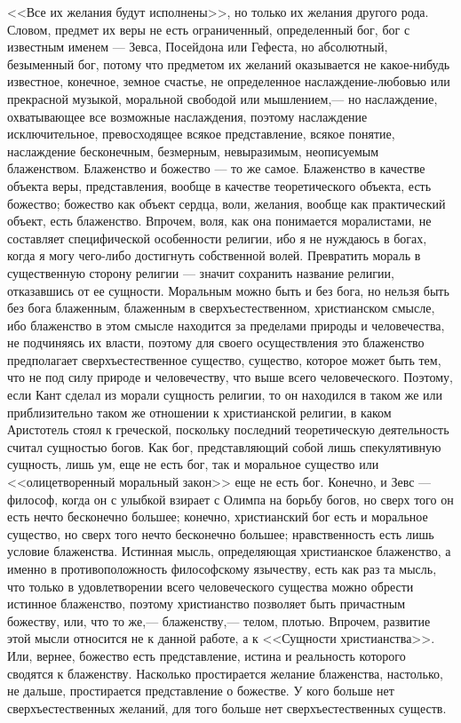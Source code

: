 \documentclass[12pt]{article}
\begin{document}
<<Все их желания будут исполнены>>, но только их желания другого рода. Словом, предмет их веры не есть ограниченный, определенный бог, бог с известным именем --- Зевса, Посейдона или Гефеста, но абсолютный, безыменный бог, потому что предметом их желаний оказывается не какое-нибудь известное, конечное, земное счастье, не определенное наслаждение-любовью или прекрасной музыкой, моральной свободой или мышлением,--- но наслаждение, охватывающее все возможные наслаждения, поэтому наслаждение исключительное, превосходящее всякое представление, всякое понятие, наслаждение бесконечным, безмерным, невыразимым, неописуемым блаженством. Блаженство и божество --- то же самое. Блаженство в качестве объекта веры, представления, вообще в качестве теоретического объекта, есть божество; божество как объект сердца, воли, желания, вообще как практический объект, есть блаженство. Впрочем, воля, как она понимается моралистами, не составляет специфической особенности религии, ибо я не нуждаюсь в богах, когда я могу чего-либо достигнуть собственной волей. Превратить мораль в существенную сторону религии --- значит сохранить название религии, отказавшись от ее сущности. Моральным можно быть и без бога, но нельзя быть без бога блаженным, блаженным в сверхъестественном, христианском смысле, ибо блаженство в этом смысле находится за пределами природы и человечества, не подчиняясь их власти, поэтому для своего осуществления это блаженство предполагает сверхъестественное существо, существо, которое может быть тем, что не под силу природе и человечеству, что выше всего человеческого. Поэтому, если Кант сделал из морали сущность религии, то он находился в таком же или приблизительно таком же отношении к христианской религии, в каком Аристотель стоял к греческой, поскольку последний теоретическую деятельность считал сущностью богов. Как бог, представляющий собой лишь спекулятивную сущность, лишь ум, еще не есть бог, так и моральное существо или <<олицетворенный моральный закон>> еще не есть бог. Конечно, и Зевс --- философ, когда он с улыбкой взирает с Олимпа на борьбу богов, но сверх того он есть нечто бесконечно большее; конечно, христианский бог есть и моральное существо, но сверх того нечто бесконечно большее; нравственность есть лишь условие блаженства. Истинная мысль, определяющая христианское блаженство, а именно в противоположность философскому язычеству, есть как раз та мысль, что только в удовлетворении всего человеческого существа можно обрести истинное блаженство, поэтому христианство позволяет быть причастным божеству, или, что то же,--- блаженству,--- телом, плотью. Впрочем, развитие этой мысли относится не к данной работе, а к <<Сущности христианства>>. Или, вернее, божество есть представление, истина и реальность которого сводятся к блаженству. Насколько простирается желание блаженства, настолько, не дальше, простирается представление о божестве. У кого больше нет сверхъестественных желаний, для того больше нет сверхъестественных существ.
\end{document}
